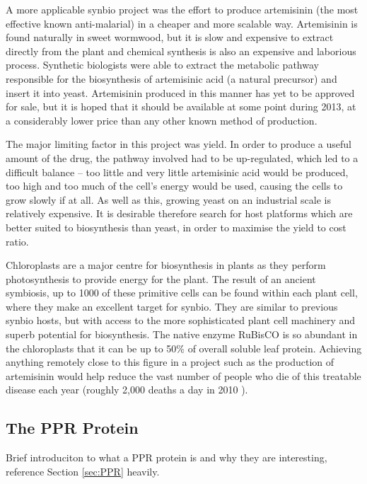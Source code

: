 A more applicable synbio project was the effort to produce 
artemisinin (the most effective known anti-malarial) in a cheaper and more 
scalable way.
Artemisinin is found naturally in sweet wormwood, but it is slow and expensive
to extract directly from the plant and chemical synthesis is also an expensive
and laborious process.
Synthetic biologists were able to extract the metabolic pathway responsible for
the biosynthesis of artemisinic acid (a natural precursor) and insert it into 
yeast\cite{yeast}.
Artemisinin produced in this manner has yet to be approved for sale, but it is
hoped that it should be available at some point during 2013, at a considerably
lower price than any other known method of production.

The major limiting factor in this project was yield.
In order to produce a useful amount of the drug, the pathway involved had to be
up-regulated, which led to a difficult balance -- too little and very little
artemisinic acid would be produced, too high and too much of the cell's
energy would be used, causing the cells to grow slowly if at all.
As well as this, growing yeast on an industrial scale is relatively expensive.
It is desirable therefore search for host platforms which are better suited to
biosynthesis than yeast, in order to maximise the yield to cost ratio.

Chloroplasts are a major centre for biosynthesis in plants as they perform
photosynthesis to provide energy for the plant.
The result of an ancient symbiosis, up to 1000 of these primitive cells can be 
found within each plant cell, where they make an excellent target for synbio.
They are similar to previous synbio hosts, but with access to the more
sophisticated plant cell machinery and superb potential for biosynthesis.
The native enzyme RuBisCO is so abundant in the chloroplasts that it 
can be up to 50\% of overall soluble leaf protein.
Achieving anything remotely close to this figure in a project such as the
production of artemisinin would help reduce the vast number of people who die 
of this treatable disease each year (roughly 2,000 deaths a day in 2010
\cite{malaria}).

\subsection{The PPR Protein}

Brief introduciton to what a PPR protein is and why they are interesting, 
reference Section \ref{sec:PPR} heavily.

